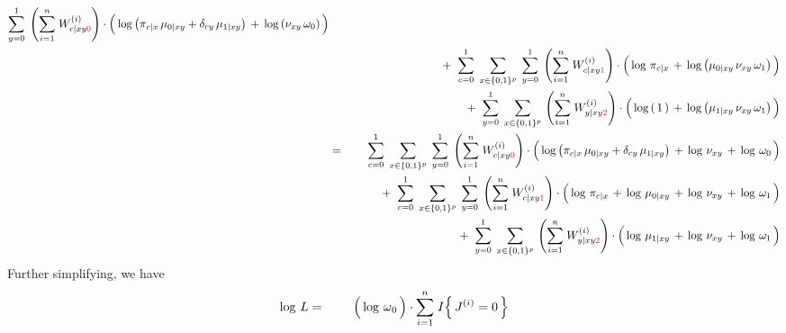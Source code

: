 \begin{enumerate}
\begin{eqnarray*}
	\overset{1}{\underset{y=0}{\sum}}\;
	\left(\overset{n}{\underset{i=1}{\sum}}\;W^{(i)}_{c \vert xy{\color{red}0}}\right)
	\cdot
	\left(\,
		\log\left(\pi_{c \vert x}\,\mu_{0 \vert xy} + \delta_{cy}\,\mu_{1\vert xy}\right)
		\,\overset{{\color{white}.}}{+}\,
		\log\left(\nu_{xy}\,\omega_{0}\right)
	\,\right)
\\
&&
	+ \;\;
	\overset{1}{\underset{c=0}{\sum}}
	\;\,\underset{x\in\{0,1\}^{p}}{\sum}\;\,
	\overset{1}{\underset{y=0}{\sum}}\;
	\left(\overset{n}{\underset{i=1}{\sum}}\;W^{(i)}_{c \vert xy{\color{red}1}}\right)
	\cdot
	\left(\,
		\log\,\pi_{c \vert x}
		\,\overset{{\color{white}.}}{+}\,
		\log\left(\mu_{0\vert xy}\,\nu_{xy}\,\omega_{1}\right)
	\,\right)
\\
&&
	+ \;\;
	\overset{1}{\underset{y=0}{\sum}}
	\;\,\underset{x\in\{0,1\}^{p}}{\sum}\,
	\left(\overset{n}{\underset{i=1}{\sum}}\;W^{(i)}_{y \vert xy{\color{red}2}}\right)
	\cdot
	\left(\,
		\log\left(\,1\,\right)
		\,\overset{{\color{white}.}}{+}\,
		\log\left(\mu_{1 \vert xy}\,\nu_{xy}\,\omega_{1}\right)
	\,\right)
\\
&=&
	{\color{white}+} \;\;
	\overset{1}{\underset{c=0}{\sum}}
	\;\,\underset{x\in\{0,1\}^{p}}{\sum}\;\,
	\overset{1}{\underset{y=0}{\sum}}\;
	\left(\overset{n}{\underset{i=1}{\sum}}\;W^{(i)}_{c \vert xy{\color{red}0}}\right)
	\cdot
	\left(\,
		\log\left(\pi_{c \vert x}\,\mu_{0 \vert xy} + \delta_{cy}\,\mu_{1\vert xy}\right)
		\,\overset{{\color{white}.}}{+}\,
		\log\,\nu_{xy}
		\,\overset{{\color{white}.}}{+}\,
		\log\,\omega_{0}
	\,\right)
\\
&&
	+ \;\;
	\overset{1}{\underset{c=0}{\sum}}
	\;\,\underset{x\in\{0,1\}^{p}}{\sum}\;\,
	\overset{1}{\underset{y=0}{\sum}}\;
	\left(\overset{n}{\underset{i=1}{\sum}}\;W^{(i)}_{c \vert xy{\color{red}1}}\right)
	\cdot
	\left(\,
		\log\,\pi_{c \vert x}
		\,\overset{{\color{white}.}}{+}\,
		\log\,\mu_{0\vert xy}
		\,\overset{{\color{white}.}}{+}\,
		\log\,\nu_{xy}
		\,\overset{{\color{white}.}}{+}\,
		\log\,\omega_{1}
	\,\right)
\\
&&
	+ \;\;
	\overset{1}{\underset{y=0}{\sum}}
	\;\,\underset{x\in\{0,1\}^{p}}{\sum}\,
	\left(\overset{n}{\underset{i=1}{\sum}}\;W^{(i)}_{y \vert xy{\color{red}2}}\right)
	\cdot
	\left(\,
		\log\,\mu_{1 \vert xy}
		\,\overset{{\color{white}.}}{+}\,
		\log\,\nu_{xy}
		\,\overset{{\color{white}.}}{+}\,
		\log\,\omega_{1}
	\,\right)
\end{eqnarray*}
Further simplifying, we have
\begin{eqnarray*}
\log\,L
&=&
	{\color{white}+} \;\;
	\left(\,\log\,\overset{{\color{white}+}}{\omega}_{0}\,\right)\cdot\overset{n}{\underset{i=1}{\sum}}\; I\!\left\{\,J^{(i)}=0\,\right\}

\end{eqnarray*}
\end{enumerate}
